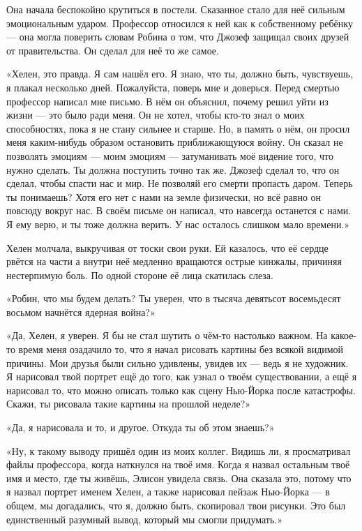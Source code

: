 \documentclass[a4paper,12pt]{book}
\begin{document}
\par
Она начала беспокойно крутиться в постели. Сказанное стало для неё сильным эмоциональным ударом. Профессор относился к ней как к собственному ребёнку — она могла поверить словам Робина о том, что Джозеф защищал своих друзей от правительства. Он сделал для неё то же самое.
\par
«Хелен, это правда. Я сам нашёл его. Я знаю, что ты, должно быть, чувствуешь, я плакал несколько дней. Пожалуйста, поверь мне и доверься. Перед смертью профессор написал мне письмо. В нём он объяснил, почему решил уйти из жизни — это было ради меня. Он не хотел, чтобы кто-то знал о моих способностях, пока я не стану сильнее и старше. Но, в память о нём, он просил меня каким-нибудь образом остановить приближающуюся войну. Он сказал не позволять эмоциям — моим эмоциям — затуманивать моё видение того, что нужно сделать. Ты должна поступить точно так же. Джозеф сделал то, что он сделал, чтобы спасти нас и мир. Не позволяй его смерти пропасть даром. Теперь ты понимаешь? Хотя его нет с нами на земле физически, но всё равно он повсюду вокруг нас. В своём письме он написал, что навсегда останется с нами. Я ему верю, и ты тоже должна верить. У нас осталось слишком мало времени.»
\par
Хелен молчала, выкручивая от тоски свои руки. Ей казалось, что её сердце рвётся на части а внутри неё медленно вращаются острые кинжалы, причиняя нестерпимую боль. По одной стороне её лица скатилась слеза.
\par
«Робин, что мы будем делать? Ты уверен, что в тысяча девятьсот восемьдесят восьмом начнётся ядерная война?»
\par
«Да, Хелен, я уверен. Я бы не стал шутить о чём-то настолько важном. На какое-то время меня озадачило то, что я начал рисовать картины без всякой видимой причины. Мои друзья были сильно удивлены, увидев их — ведь я не художник. Я нарисовал твой портрет ещё до того, как узнал о твоём существовании, а ещё я нарисовал то, что можно описать только как сцену Нью-Йорка после катастрофы. Скажи, ты рисовала такие картины на прошлой неделе?»
\par
«Да, я нарисовала и то, и другое. Откуда ты об этом знаешь?»
\par
«Ну, к такому выводу пришёл один из моих коллег. Видишь ли, я просматривал файлы профессора, когда наткнулся на твоё имя. Когда я назвал остальным твоё имя и место, где ты живёшь, Элисон увидела связь. Она сказала это, потому что я назвал портрет именем Хелен, а также нарисовал пейзаж Нью-Йорка — в общем, мы догадались, что я, должно быть, скопировал твои рисунки. Это был единственный разумный вывод, который мы смогли придумать.»
\end{document}
